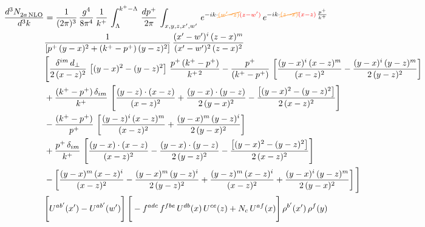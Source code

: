 \documentclass[9pt]{article}
\numberwithin{equation}{section}
\begin{document}
\begin{align}
    \frac{d^{3}N_{2a\,\rm NLO}^{\rm}}{d^{3}k}  & =  \frac{1}{(2\pi)^{3}}\,\frac{g^{4}}{8\pi^{4}}\,\frac{1}{k^{+}}\,\int_{\Lambda}^{k^{+}-\Lambda}\, \frac{dp^{+}}{2\pi}\, \int_{x,y,z,x',w'}\,e^{-ik\cdot{\color{orange}\cancel{(w'-z)}}{\color{red}(z-w')}}\,e^{-ik\cdot {\color{orange}\cancel{(z-x)}}{\color{red}(x-z)}\,\frac{p^{+}}{k^{+}}}\notag \\ & \frac{1}{\left[p^{+}\,(y-x)^{2}+(k^{+}-p^{+})\,(y-z)^{2}\right]}\, \frac{(x'-w')^{i}\,(z-x)^{m}}{(x'-w')^{2}\,(z-x)^{2}} \notag \\ & \Bigg[\frac{\delta^{im}\,d_{\perp}}{2\,(x-z)^{2}}\,\left[(y-x)^{2}-(y-z)^{2}\right]\,\frac{p^{+}\,(k^{+}-p^{+})}{k^{+\,2}}-\frac{p^{+}}{(k^{+}-p^{+})}\,\left[\frac{(y-x)^{i}\,(x-z)^{m}}{(x-z)^{2}}-\frac{(y-x)^{i}\,(y-z)^{m}}{2\,(y-z)^{2}}\right]\notag \\ & +\frac{(k^{+}-p^{+})\,\delta_{im}}{k^{+}}\,\left[\frac{(y-z)\cdot (x-z)}{(x-z)^{2}}+\frac{(y-x)\cdot (y-z)}{2\,(y-x)^{2}}-\frac{\left[(y-x)^{2}-(y-z)^{2}\right]}{2\,(x-z)^{2}}\right]\notag \\ & -\frac{(k^{+}-p^{+})}{p^{+}}\,\left[\frac{(y-z)^{i}\,(x-z)^{m}}{(x-z)^{2}}+\frac{(y-x)^{m}\,(y-z)^{i}}{2\,(y-x)^{2}}\right]\notag \\ & +\frac{p^{+}\,\delta_{im}}{k^{+}}\,\left[\frac{(y-x)\cdot (x-z)}{(x-z)^{2}}-\frac{(y-x)\cdot (y-z)}{2\,(y-z)^{2}}-\frac{\left[(y-x)^{2}-(y-z)^{2}\right]}{2\,(x-z)^{2}}\right]\notag \\ &-\left[\frac{(y-x)^{m}\,(x-z)^{i}}{(x-z)^{2}}-\frac{(y-x)^{m}\,(y-z)^{i}}{2\,(y-z)^{2}}+\frac{(y-z)^{m}\,(x-z)^{i}}{(x-z)^{2}}+\frac{(y-x)^{i}\,(y-z)^{m}}{2\,(y-x)^{2}}\right]\Bigg] \notag \\ & \Bigg[U^{ab'}(x')-U^{ab'}(w')\Bigg]\,\Bigg[-f^{adc}\,f^{fbe}\,U^{db}(x)\,U^{ce}(z)+N_{c}\,U^{af}(x)\Bigg]\,\rho^{b'}(x')\,\rho^{f}(y)
\end{align}
\end{document}
